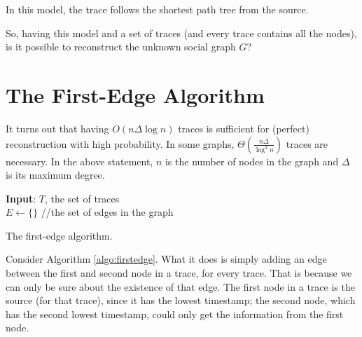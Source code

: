 In this model, the trace follows the shortest path tree from the source.

So, having this model and a set of traces (and every trace contains all the nodes), is it possible to reconstruct the unknown social graph $G$? 

\section{The First-Edge Algorithm}
It turns out that having $O(n\Delta\log n)$ traces is sufficient for (perfect) reconstruction with high probability. In some graphs, $\Theta\left(\frac{n\Delta}{\log^2n}\right)$ traces are necessary.
In the above statement, $n$ is the number of nodes in the graph and $\Delta$ is its maximum degree. 
\begin{algorithm}
	\textbf{Input}: $T$, the set of traces\\
	$E \gets \{\}$ //the set of edges in the graph \;
	\caption{The first-edge algorithm.}
	\label{algo:firstedge}
\end{algorithm}

 Consider Algorithm \ref{algo:firstedge}. What it does is simply adding an edge between the first and second node in a trace, for every trace. That is because we can only be sure about the existence of that edge. The first node in a trace is the source (for that trace), since it has the lowest timestamp; the second node, which has the second lowest timestamp, could only get the information from the first node.
 
